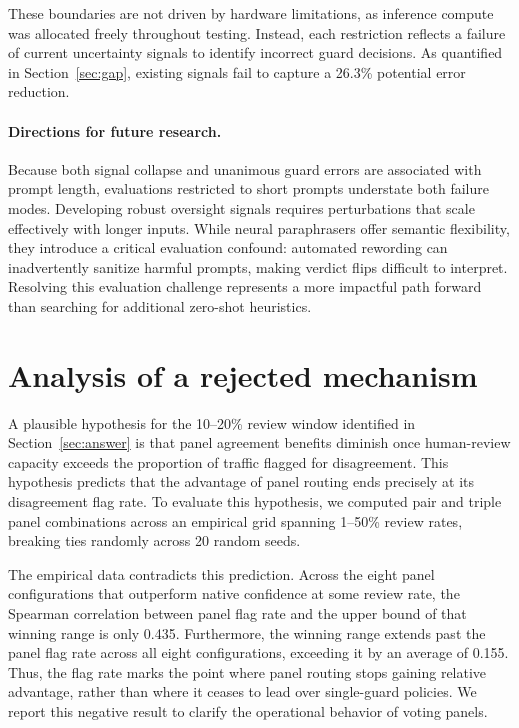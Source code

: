 \documentclass[11pt]{article}
\begin{document}
These boundaries are not driven by hardware limitations, as inference compute was allocated freely throughout testing. Instead, each restriction reflects a failure of current uncertainty signals to identify incorrect guard decisions. As quantified in Section~\ref{sec:gap}, existing signals fail to capture a 26.3\% potential error reduction.

\paragraph{Directions for future research.} Because both signal collapse and unanimous guard errors are associated with prompt length, evaluations restricted to short prompts understate both failure modes. Developing robust oversight signals requires perturbations that scale effectively with longer inputs. While neural paraphrasers offer semantic flexibility, they introduce a critical evaluation confound: automated rewording can inadvertently sanitize harmful prompts, making verdict flips difficult to interpret. Resolving this evaluation challenge represents a more impactful path forward than searching for additional zero-shot heuristics.

\section{Analysis of a rejected mechanism}
\label{sec:rejected}

A plausible hypothesis for the 10--20\% review window identified in Section~\ref{sec:answer} is that panel agreement benefits diminish once human-review capacity exceeds the proportion of traffic flagged for disagreement. This hypothesis predicts that the advantage of panel routing ends precisely at its disagreement flag rate. To evaluate this hypothesis, we computed pair and triple panel combinations across an empirical grid spanning 1--50\% review rates, breaking ties randomly across 20 random seeds.

The empirical data contradicts this prediction. Across the eight panel configurations that outperform native confidence at some review rate, the Spearman correlation between panel flag rate and the upper bound of that winning range is only 0.435. Furthermore, the winning range extends past the panel flag rate across all eight configurations, exceeding it by an average of 0.155. Thus, the flag rate marks the point where panel routing stops gaining relative advantage, rather than where it ceases to lead over single-guard policies. We report this negative result to clarify the operational behavior of voting panels.
\end{document}
